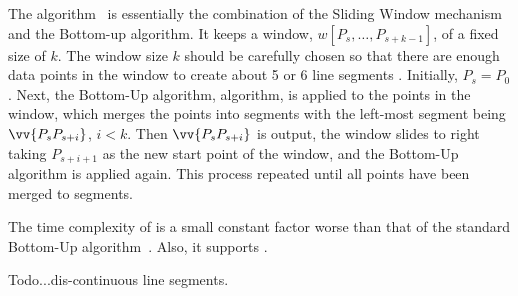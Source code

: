 {The \swab algorithm~\cite{Keogh:online} is essentially the combination of the Sliding Window mechanism and the Bottom-up algorithm.
It keeps a window, $w[P_s, \ldots, P_{s+k-1}]$, of a fixed size of $k$.
The window size $k$ should be carefully chosen so that there are enough data points in the window to create about 5 or 6 line segments \cite{Keogh:online}.
Initially, $P_s=P_0$.
Next, the Bottom-Up algorithm, \eg \pavlidis algorithm, is applied to the points in the window, which merges the points into segments with the left-most segment being $\vv{P_sP_{s+i}}$, $i<k$.
Then $\vv{P_sP_{s+i}}$ is output, the window slides to right taking $P_{s+i+1}$ as the new start point of the window, and the Bottom-Up algorithm is applied again.
This process repeated until all points have been merged to segments.

The time complexity of \swab is a small constant factor worse than that of the standard Bottom-Up algorithm~\cite{Keogh:online}.
Also, it supports \sed. %

\textcolor[rgb]{1.00,0.00,0.00}{Todo...dis-continuous line segments.}

} %

